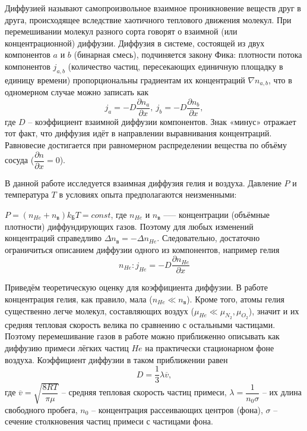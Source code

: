 \documentclass[a4paper,12pt]{article}
\begin{document}
Диффузией называют самопроизвольное взаимное проникновение веществ друг в друга, происходящее вследствие хаотичного теплового движения молекул. При перемешивании молекул разного сорта говорят о взаимной (или концентрационной) диффузии. Диффузия в системе, состоящей из двух компонентов $a$ и $b$ (бинарная смесь), подчиняется закону Фика: плотности потока компонентов $j_{a, b}$ (количество частиц, пересекающих единичную площадку в единицу времени) пропорциональны градиентам их концентраций $\nabla n_{a, b}$, что в одномерном случае можно записать как 
\begin{equation}
	j_a = -D \dfrac{\partial n_a}{\partial x},~j_b = -D \dfrac{\partial n_b}{\partial x},
\end{equation}
где $D$ -- коэффициент взаимной диффузии компонентов. Знак «минус» отражает тот факт, что диффузия идёт в направлении выравнивания концентраций. Равновесие достигается при равномерном распределении вещества по объёму сосуда ($\dfrac{\partial n}{\partial x} = 0$).

В данной работе исследуется взаимная диффузия гелия и воздуха. Давление $P$ и температура $T$ в условиях опыта предполагаются неизменными: 

$P = (n_{He} + n_{\text{в}}) k_{\text{Б}} T = const$, где $n_{He}$ и $n_{\text{в}}$ --— концентрации (объёмные плотности) диффундирующих газов. Поэтому для любых изменений концентраций справедливо $\Delta n_{\text{в}} = - \Delta n_{He}$. Следовательно, достаточно ограничиться описанием диффузии одного из компонентов, например гелия 
\begin{equation}
	n_{He}:j_{He} = -D \dfrac{\partial n_{He}}{\partial x}
\end{equation}

Приведём теоретическую оценку для коэффициента диффузии. В работе концентрация гелия, как правило, мала ($n_{He} \ll n_{\text{в}}$). Кроме того, атомы гелия существенно легче молекул, составляющих воздух ($\mu_{He} \ll \mu_{N_2}, \mu_{O_2}$), значит и их средняя тепловая скорость велика по сравнению с остальными частицами. Поэтому перемешивание газов в работе можно приближенно описывать как диффузию примеси лёгких частиц $He$ на практически стационарном фоне воздуха. Коэффициент диффузии в таком приближении равен 
\begin{equation}
	D = \dfrac{1}{3} \lambda \overline{v},
\end{equation}
где $\overline{v} = \sqrt{\dfrac{8RT}{\pi \mu}}$ -- средняя тепловая скорость частиц примеси,
$\lambda = \dfrac{1}{n_0 \sigma}$ -- их длина свободного пробега, $n_0$ -- концентрация рассеивающих центров (фона), $\sigma$ -- сечение столкновения частиц примеси с частицами фона.
\end{document}
